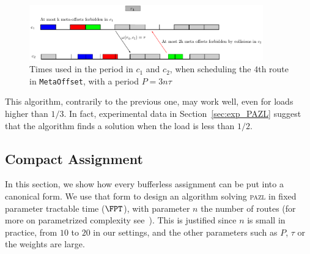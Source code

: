 \documentclass[a4paper,10pt]{journal}
\newcommand\metaoffset{\texttt{MetaOffset}\xspace}
\newcommand\pazl{\textsc{pazl}\xspace}
\begin{document}
     \begin{figure}
      \begin{center}
      \includegraphics[width=0.9\textwidth]{ex3nt.pdf}
      \end{center}
      \caption{Times used in the period in $c_1$ and $c_2$, when scheduling the $4$th route in \metaoffset, with a period $P = 3n\tau$}
      \label{fig:metaoffset}
      \end{figure}


% 
% 
% 
	
This algorithm, contrarily to the previous one, may work well, even for loads higher than $1/3$.
In fact, experimental data in Section~\ref{sec:exp_PAZL} suggest that the algorithm finds a solution when the load is less than $1/2$.


\subsection{Compact Assignment}

In this section, we show how every bufferless assignment can be put into a canonical form.
We use that form to design an algorithm solving \pazl in fixed parameter tractable time ($\FPT$), with parameter $n$ the number of routes (for more on parametrized complexity see~\cite{downey2012parameterized}). This is justified since $n$ is small in practice, from $10$ to $20$ in our settings, and the other parameters such as $P$, $\tau$ or the weights are large.
\end{document}
